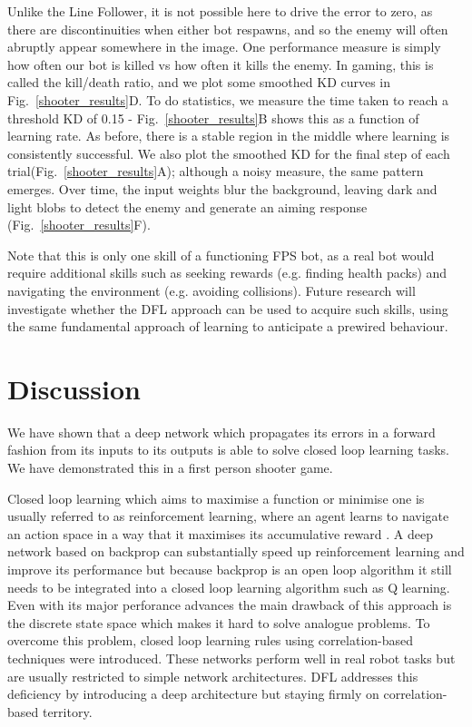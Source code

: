 \documentclass{article}
\begin{document}
Unlike the Line Follower, it is not possible here to drive the error
to zero, as there are discontinuities when either bot respawns, and so
the enemy will often abruptly appear somewhere in the image. One
performance measure is simply how often our bot is killed vs how often
it kills the enemy. In gaming, this is called the kill/death ratio,
and we plot some smoothed KD curves in Fig.~\ref{shooter_results}D. To
do statistics, we measure the time taken to reach a threshold KD of 0.15 -
Fig.~\ref{shooter_results}B shows this as a function of learning
rate. As before, there is a stable region in the middle where learning
is consistently successful. We also plot the smoothed KD for the final
step of each trial(Fig.~\ref{shooter_results}A); although a noisy
measure, the same pattern emerges. Over time, the input weights blur
the background, leaving dark and light blobs to detect the enemy and
generate an aiming response (Fig.~\ref{shooter_results}F).

Note that this is only one skill of a functioning FPS bot, as a real bot would
require additional skills such as seeking rewards (e.g. finding health packs) and
navigating the environment (e.g. avoiding collisions). Future research
will investigate whether the DFL approach can be used to acquire such
skills, using the same fundamental approach of learning to anticipate
a prewired behaviour.


\section{Discussion}
We have shown that a deep network which propagates its errors in a
forward fashion from its inputs to its outputs is able to solve closed
loop learning tasks. We have demonstrated this in a first person
shooter game.

Closed loop learning which aims to maximise a function or minimise one
is usually referred to as reinforcement learning, where an agent
learns to navigate an action space in a way that it maximises its
accumulative reward \cite{Dayan1992}. A deep network based on backprop
can substantially speed up reinforcement learning and improve its
performance \cite{Guo2014} but because backprop is an open loop algorithm
it still needs to be integrated into a closed loop learning algorithm such
as Q learning. Even with its major perforance advances the main
drawback of this approach is the discrete state space which makes it
hard to solve analogue problems. To overcome this problem, closed loop
learning rules using correlation-based techniques \cite{Verschure91}
were introduced. These networks perform well in real robot tasks but
are usually restricted to simple network architectures. DFL addresses
this deficiency by introducing a deep architecture but staying firmly
on correlation-based territory.
\end{document}

